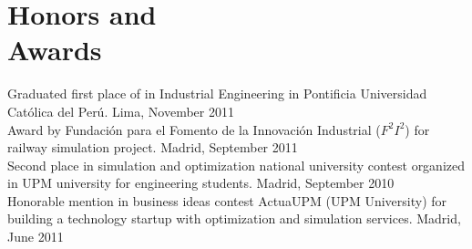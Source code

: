 	\section{Honors and\\Awards }
   
   				Graduated first place of in Industrial Engineering in Pontificia Universidad Católica del Perú. \hfill Lima, November 2011 \vspace{1mm} \\
    			Award by Fundación para el Fomento de la Innovación Industrial ($F^2I^2$) for railway simulation project. \hfill Madrid, September 2011 \vspace{1mm} \\
   				Second place in simulation and optimization national university contest organized in UPM university for engineering students. \hfill Madrid, September 2010 \vspace{1mm}\\%
   				Honorable mention in business ideas contest ActuaUPM (UPM University) for building a technology startup with optimization and simulation services. \hfill Madrid, June 2011 \vspace{1mm}\\%
